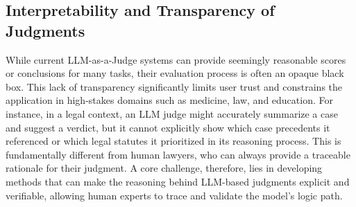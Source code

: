 

\subsection{Interpretability and Transparency of Judgments}\label{subsec:challenges_interpretability}

While current LLM-as-a-Judge systems can provide seemingly reasonable scores or conclusions for many tasks, their evaluation process is often an opaque black box. This lack of transparency significantly limits user trust and constrains the application in high-stakes domains such as medicine, law, and education. For instance, in a legal context, an LLM judge might accurately summarize a case and suggest a verdict, but it cannot explicitly show which case precedents it referenced or which legal statutes it prioritized in its reasoning process. This is fundamentally different from human lawyers, who can always provide a traceable rationale for their judgment. A core challenge, therefore, lies in developing methods that can make the reasoning behind LLM-based judgments explicit and verifiable, allowing human experts to trace and validate the model's logic path.

